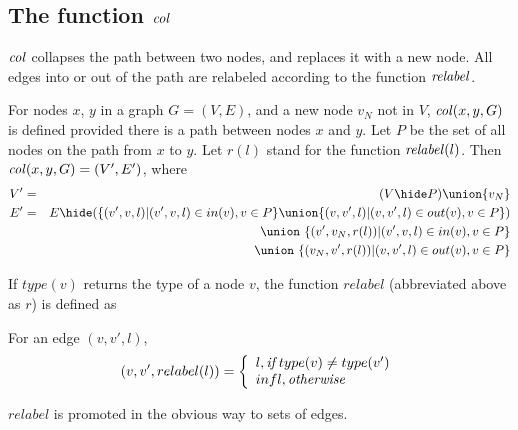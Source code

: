\subsection{The function $\col$}




$\col$ collapses the path between two nodes, and replaces it with a new node. All edges into or out of the path are relabeled according to the function $\mathit{relabel}$.
  
\begin{definition}[$\col$]  \label{def:col}
  For nodes $x$, $y$ in a graph $G = (V,E)$, and a new node $v_{N}$ not in $V$,  $\mathit{col}(x,y,G)$ is defined provided there is a path between nodes $x$ and $y$. Let $P$ be the set of all nodes on the path from $x$ to $y$. Let $r(l)$ stand for the function $\mathit{relabel}(l)$. Then $\mathit{col}(x,y,G) =  (V',E')$, where 
  \begin{eqnarray*}
  V' & = & (V\hide P) \union \{v_N\}     \\
  E' & = & E\hide (
                   \{(v',v,l)|(v',v,l) \in in(v), v\in P\}
                   \union
                   \{(v,v',l)|(v,v',l) \in out(v), v\in P\}
                  )\\
  && \union\ \{(v',v_{N},r(l))|(v',v,l) \in in(v), v\in P\}\\
  && \union\ \{(v_{N},v',r(l))|(v,v',l) \in out(v), v\in P\}\\
  \end{eqnarray*}
\end{definition}
If $type(v)$ returns the type of a node $v$, the function $relabel$ (abbreviated above as $r$) is defined as 
\begin{definition}[$relabel$] \label{def:relabel}
  For an edge $(v,v',l)$, 
  \[
   (v,v',relabel(l)) = \left\{
   \begin{array}{l}
      l,    {\emph{if}}\; type(v) \neq type(v') \\
      infl, \emph{otherwise}
   \end{array}   \right.
  \]
\end{definition}
\noindent
$relabel$ is promoted in the obvious way to sets of edges. 

